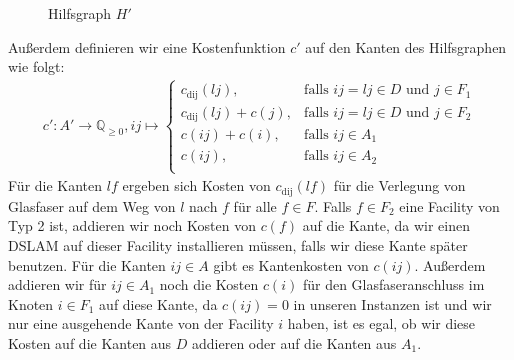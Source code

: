 \documentclass[11pt,a4paper]{article}
\newcommand{\Q}{\mathbb{Q}}
\theoremstyle{my_th_style1}
\begin{document}
\begin{figure}[h]
\caption{Hilfsgraph $H'$} \label{H''}
\end{figure}
Außerdem definieren wir eine Kostenfunktion $c'$ auf den Kanten des Hilfsgraphen wie folgt:
\begin{align}
\label{first_c_prime}
c': A' \rightarrow \Q_{\geq 0}, ij \mapsto \left\{\begin{array}{cl} 
c_{\text{dij}}(lj), & \text{falls } ij = lj \in D \text{ und } j \in F_1\\ 
c_{\text{dij}}(lj)+c(j), & \text{falls } ij = lj \in D \text{ und } j \in F_2\\ 
c(ij) + c(i), & \text{falls } ij \in A_1\\ 
c(ij), & \text{falls } ij \in A_2\\ 
\end{array}
\right.
\end{align}
Für die Kanten $lf$ ergeben sich Kosten von $c_{\text{dij}}(lf)$ für die Verlegung von Glasfaser auf dem Weg von $l$ nach $f$ für alle $f \in F$. Falls $f \in F_2$ eine Facility von Typ 2 ist, addieren wir noch Kosten von $c(f)$ auf die Kante, da wir einen DSLAM auf dieser Facility installieren m\"ussen, falls wir diese Kante sp\"ater benutzen. Für die Kanten $ij \in A$ gibt es Kantenkosten von $c(ij)$. Außerdem addieren wir für $ij \in A_1$ noch die Kosten \(c(i)\) für den Glasfaseranschluss im Knoten \(i \in F_1\) auf diese Kante, da $c(ij)=0$ in unseren Instanzen ist und wir nur eine ausgehende Kante von der Facility $i$ haben, ist es egal, ob wir diese Kosten auf die Kanten aus \(D\) addieren oder auf die Kanten aus \(A_1\).
\end{document}
